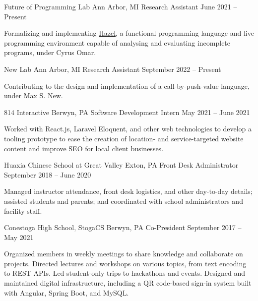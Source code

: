 \documentclass[letterpaper,11pt]{article}
\begin{document}
  \begin{rsectionlist}
    \rsectionitem
      {Future of Programming Lab}
      {Ann Arbor, MI}
      {Research Assistant}
      {June 2021 -- Present}
      
      Formalizing and implementing \href{https://hazel.org}{Hazel}, a functional programming
      language and live programming environment capable of analysing and evaluating incomplete
      programs, under Cyrus Omar.

      \begin{rpointlist}
      \end{rpointlist}

    \rsectionitem
      {New Lab}
      {Ann Arbor, MI}
      {Research Assistant}
      {September 2022 -- Present}

      Contributing to the design and implementation of a call-by-push-value language, under Max S.
      New.

    \rsectionitem
      {814 Interactive}
      {Berwyn, PA}
      {Software Development Intern}
      {May 2021 -- June 2021}

      Worked with React.js, Laravel Eloquent, and other web technologies to develop a tooling
      prototype to ease the creation of location- and service-targeted website content and improve
      SEO for local client businesses.

    \rsectionitem
      {Huaxia Chinese School at Great Valley}
      {Exton, PA}
      {Front Desk Administrator}
      {September 2018 -- June 2020}

      Managed instructor attendance, front desk logistics, and other day-to-day details; assisted
      students and parents; and coordinated with school administrators and facility staff.

    \rsectionitem
      {Conestoga High School, StogaCS}
      {Berwyn, PA}
      {Co-President}
      {September 2017 -- May 2021}

      Organized members in weekly meetings to share knowledge and collaborate on projects. Directed
      lectures and workshops on various topics, from text encoding to REST APIs. Led student-only
      trips to hackathons and events. Designed and maintained digital infrastructure, including a QR
      code-based sign-in system built with Angular, Spring Boot, and MySQL.
  \end{rsectionlist}
\end{document}
